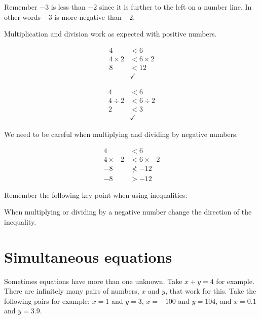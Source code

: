 \documentclass[
  a4paper,
]{scrbook}
\begin{document}
Remember \(-3\) is less than \(-2\) since it is further to the left on a
number line. In other words \(-3\) is more negative than \(-2\).

Multiplication and division work as expected with positive numbers.

\[
\begin{aligned} 4 &< 6 \\
4 \times 2 &< 6 \times 2\\
8 &< 12\\
&\checkmark
\end{aligned}
\]

\[
\begin{aligned} 4 &< 6 \\
4 \div 2 &< 6 \div 2\\
2 &< 3\\
&\checkmark
\end{aligned}
\]

We need to be careful when multiplying and dividing by negative numbers.

\[
\begin{aligned} 4 &< 6 \\
4 \times -2 &< 6 \times -2\\
-8 &\nless -12\\
-8 &> -12
\end{aligned}
\]

\begin{tcolorbox}[enhanced jigsaw, opacityback=0, left=2mm, toptitle=1mm, title=\textcolor{quarto-callout-note-color}{\faInfo}\hspace{0.5em}{Note}, breakable, colbacktitle=quarto-callout-note-color!10!white, opacitybacktitle=0.6, bottomtitle=1mm, arc=.35mm, colback=white, leftrule=.75mm, bottomrule=.15mm, colframe=quarto-callout-note-color-frame, rightrule=.15mm, titlerule=0mm, toprule=.15mm, coltitle=black]
Remember the following key point when using inequalities:

When multiplying or dividing by a negative number change the direction
of the inequality.
\end{tcolorbox}

\hypertarget{simultaneous-equations}{%
\section{Simultaneous equations}\label{simultaneous-equations}}

Sometimes equations have more than one unknown. Take \(x + y = 4\) for
example. There are infinitely many pairs of numbers, \(x\) and \(y\),
that work for this. Take the following pairs for example: \(x = 1\) and
\(y=3\), \(x = -100\) and \(y=104\), and \(x = 0.1\) and \(y=3.9\).
\end{document}
